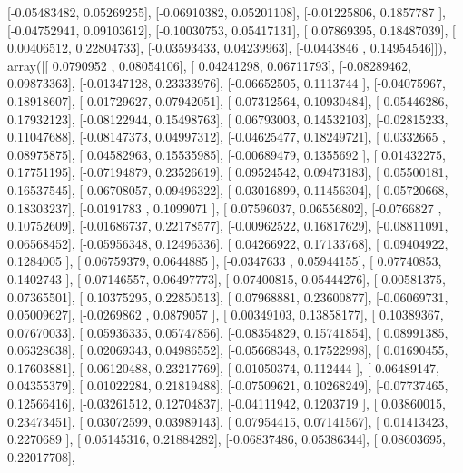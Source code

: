 \documentclass{article}
\begin{document}
       [-0.05483482,  0.05269255],
       [-0.06910382,  0.05201108],
       [-0.01225806,  0.1857787 ],
       [-0.04752941,  0.09103612],
       [-0.10030753,  0.05417131],
       [ 0.07869395,  0.18487039],
       [ 0.00406512,  0.22804733],
       [-0.03593433,  0.04239963],
       [-0.0443846 ,  0.14954546]]), array([[ 0.0790952 ,  0.08054106],
       [ 0.04241298,  0.06711793],
       [-0.08289462,  0.09873363],
       [-0.01347128,  0.23333976],
       [-0.06652505,  0.1113744 ],
       [-0.04075967,  0.18918607],
       [-0.01729627,  0.07942051],
       [ 0.07312564,  0.10930484],
       [-0.05446286,  0.17932123],
       [-0.08122944,  0.15498763],
       [ 0.06793003,  0.14532103],
       [-0.02815233,  0.11047688],
       [-0.08147373,  0.04997312],
       [-0.04625477,  0.18249721],
       [ 0.0332665 ,  0.08975875],
       [ 0.04582963,  0.15535985],
       [-0.00689479,  0.1355692 ],
       [ 0.01432275,  0.17751195],
       [-0.07194879,  0.23526619],
       [ 0.09524542,  0.09473183],
       [ 0.05500181,  0.16537545],
       [-0.06708057,  0.09496322],
       [ 0.03016899,  0.11456304],
       [-0.05720668,  0.18303237],
       [-0.0191783 ,  0.1099071 ],
       [ 0.07596037,  0.06556802],
       [-0.0766827 ,  0.10752609],
       [-0.01686737,  0.22178577],
       [-0.00962522,  0.16817629],
       [-0.08811091,  0.06568452],
       [-0.05956348,  0.12496336],
       [ 0.04266922,  0.17133768],
       [ 0.09404922,  0.1284005 ],
       [ 0.06759379,  0.0644885 ],
       [-0.0347633 ,  0.05944155],
       [ 0.07740853,  0.1402743 ],
       [-0.07146557,  0.06497773],
       [-0.07400815,  0.05444276],
       [-0.00581375,  0.07365501],
       [ 0.10375295,  0.22850513],
       [ 0.07968881,  0.23600877],
       [-0.06069731,  0.05009627],
       [-0.0269862 ,  0.0879057 ],
       [ 0.00349103,  0.13858177],
       [ 0.10389367,  0.07670033],
       [ 0.05936335,  0.05747856],
       [-0.08354829,  0.15741854],
       [ 0.08991385,  0.06328638],
       [ 0.02069343,  0.04986552],
       [-0.05668348,  0.17522998],
       [ 0.01690455,  0.17603881],
       [ 0.06120488,  0.23217769],
       [ 0.01050374,  0.112444  ],
       [-0.06489147,  0.04355379],
       [ 0.01022284,  0.21819488],
       [-0.07509621,  0.10268249],
       [-0.07737465,  0.12566416],
       [-0.03261512,  0.12704837],
       [-0.04111942,  0.1203719 ],
       [ 0.03860015,  0.23473451],
       [ 0.03072599,  0.03989143],
       [ 0.07954415,  0.07141567],
       [ 0.01413423,  0.2270689 ],
       [ 0.05145316,  0.21884282],
       [-0.06837486,  0.05386344],
       [ 0.08603695,  0.22017708],
\end{document}
